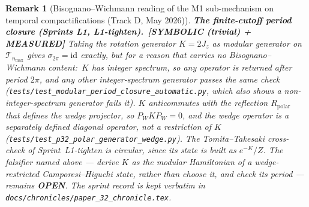 \documentclass[11pt]{article}
\newtheorem{remark}{Remark}
\begin{document}
\begin{remark}[Bisognano--Wichmann reading of the M1 sub-mechanism on
temporal compactifications (Track D, May 2026)]
\textbf{The finite-cutoff period closure (Sprints L1, L1-tighten).}\
\textbf{[SYMBOLIC (trivial) + MEASURED]} Taking the rotation generator
$K = 2J_z$ as modular generator on $\mathcal{T}_{n_{\max}}$ gives
$\sigma_{2\pi} = \mathrm{id}$ exactly, but for a reason that carries no
Bisognano--Wichmann content:\ $K$ has integer spectrum, so any operator
is returned after period $2\pi$, and any other integer-spectrum generator
passes the same check
(\texttt{tests/test\_modular\_period\_closure\_automatic.py}, which also
shows a non-integer-spectrum generator fails it).  $K$ anticommutes with
the reflection $R_{\mathrm{polar}}$ that defines the wedge projector, so
$P_W K P_W = 0$, and the wedge operator is a separately defined diagonal
operator, not a restriction of $K$
(\texttt{tests/test\_p32\_polar\_generator\_wedge.py}).  The
Tomita--Takesaki cross-check of Sprint~L1-tighten is circular, since its
state is built as $e^{-K}/Z$.  The falsifier named above --- \emph{derive}
$K$ as the modular Hamiltonian of a wedge-restricted Camporesi--Higuchi
state, rather than choose it, and check its period --- remains
\textbf{OPEN}.  The sprint record is kept verbatim in
\texttt{docs/chronicles/paper\_32\_chronicle.tex}.

\end{remark}
\end{document}
